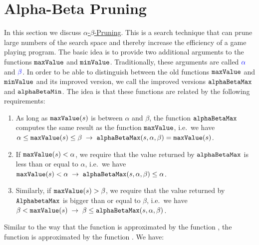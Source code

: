 \section{Alpha-Beta Pruning}
In this section we discuss \href{https://en.wikipedia.org/wiki/Alpha-beta_pruning}{$\alpha$-$\beta$-Pruning}.
This is a search technique that can prune large numbers of the search space and thereby increase the efficiency
of a game playing program.  The basic idea is to provide two additional arguments to the functions
$\texttt{maxValue}$ and $\texttt{minValue}$.  Traditionally, these arguments are called ${\color{blue}\alpha}$ and ${\color{blue}\beta}$.  In order to be able to
distinguish between the old functions $\texttt{maxValue}$ and  $\texttt{minValue}$ and its
improved version, we call the improved versions  
$\texttt{alphaBetaMax}$ and $\texttt{alphaBetaMin}$.  The idea is that these functions are
related by the following requirements: 
\begin{enumerate}
\item As long as $\texttt{maxValue}(s)$ is between $\alpha$ and $\beta$, the function
      $\texttt{alphaBetaMax}$ computes the same result as the function $\texttt{maxValue}$,
      i.e.~we have
      \\[0.2cm]
      \hspace*{0.3cm}
      $\alpha \leq \texttt{maxValue}(s) \leq \beta \;\rightarrow\;
         \texttt{alphaBetaMax}(s, \alpha, \beta) = \texttt{maxValue}(s)
      $.
\item If $\texttt{maxValue}(s) < \alpha$, we require that the value returned by
      $\texttt{alphaBetaMax}$ is less than or equal to $\alpha$, i.e.~we have 
      \\[0.2cm]
      \hspace*{0.3cm}
      $\texttt{maxValue}(s) < \alpha \;\rightarrow\; \texttt{alphaBetaMax}(s, \alpha, \beta) \leq \alpha$.
\item Similarly, if $\texttt{maxValue}(s) > \beta$, we require that the value
      returned by $\texttt{AlphabetaMax}$ is bigger than or equal to $\beta$, i.e.~we have 
      \\[0.2cm]
      \hspace*{0.3cm}
      $\beta < \texttt{maxValue}(s) \;\rightarrow\; \beta \leq \texttt{alphaBetaMax}(s, \alpha, \beta)$.
\end{enumerate}
Similar to the way that the function  is approximated by the function ,
the function  is approximated by the function .  We have: 
